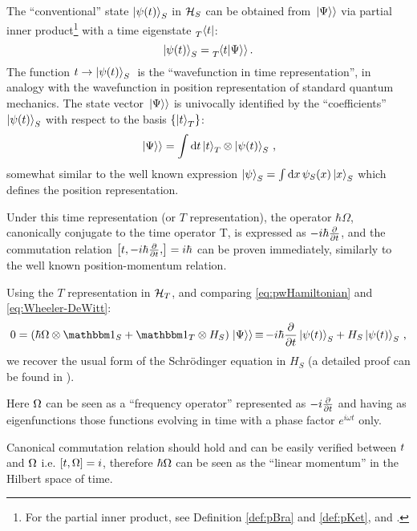 The ``conventional'' state $\ket{\psi(t)}_S$ in $\mathcal{H}_S$
can be obtained from $\left.\left| \Psi \right\rangle\right\rangle$ via partial inner product\footnote{
  For the partial inner product,
  see Definition \ref{def:pBra} and \ref{def:pKet},
  and \cite[.3]{QMT_Jacobs}.
}
with a time eigenstate $\prescript{}{T}{\bra{t}}$:
\begin{equation*}
  \ket{\psi(t)}_S = \prescript{}{T}{\!\left.\left\langle t \middle| \Psi \right\rangle\right\rangle} \, \text{.}
\end{equation*}
The function $ t \rightarrow \ket{\psi(t)}_S \; $ is the
``wavefunction in time representation'', in analogy
with the wavefunction in position representation of standard quantum mechanics.
The state vector $\left.\left| \Psi \right\rangle\right\rangle$ is univocally identified by the ``coefficients'' $\ket{\psi(t)}_S$
with respect to the basis $\left\{\ket{t}_T\right\}$:
\begin{equation*}
  \left.\left| \Psi \right\rangle\right\rangle = \int \dd{t} \ket{t}_T \otimes \ket{\psi(t)}_S \, \text{,}
\end{equation*}
somewhat similar to the well known expression $\ket{\psi}_S = \int \dd{x} \psi_{S}(x) \ket{x}_S$
which defines the position representation.

Under this time representation (or $T$ representation), the operator $\hbar\Omega$,
canonically conjugate to the time operator T, is expressed as $-i\hbar\pdv{t}$,
and the commutation relation $\comm{t, -i\hbar\pdv{t}}{} = i\hbar$ can be proven
immediately, similarly to the well known position-momentum relation.


Using the $T$ representation in $\mathcal{H}_T$,
and comparing \eqref{eq:pwHamiltonian} and \eqref{eq:Wheeler-DeWitt}:
\begin{equation}\label{eq:schrod_from_pw}
  0 = \qty(\hbar\op{\Omega}\ox\idop_S + \idop_{T}\ox\op{H}_S)\dket{\Psi}
    \repr -i\hbar\pdv{t}\ket{\psi(t)}_{S} + \op{H}_S\ket{\psi(t)}_{S}
    \,\text{,}
\end{equation}
we recover the usual form of the Schr\"{o}dinger equation in $H_S$
(a detailed proof can be found in \cite[709--710]{Wootters:Loyola}).

Here ${\Omega}$ can be seen as a ``frequency operator''
represented as $-i\pdv{t}$ and having as eigenfunctions
those functions evolving in time with a phase factor $e^{i \omega t}$ only.

Canonical commutation relation should hold and can be easily verified
between ${t}$ and ${\Omega}$
i.e. $[{t}, {\Omega}] = i$,
therefore $\hbar{\Omega}$ can be seen as the ``linear momentum''
in the Hilbert space of time.

